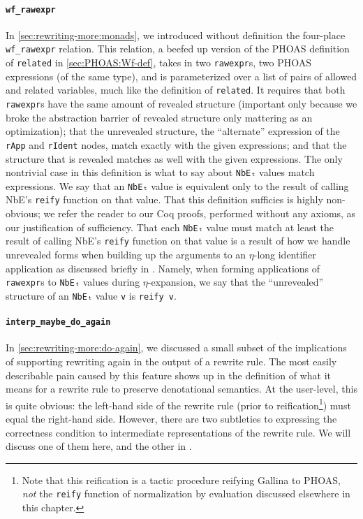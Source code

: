 \paragraph{\texorpdfstring{\texttt{wf_rawexpr}}{wf\_rawexpr}}
In \autoref{sec:rewriting-more:monads}, we introduced without definition the four-place \texttt{wf_rawexpr} relation.
This relation, a beefed up version of the PHOAS definition of \texttt{related} in \autoref{sec:PHOAS:Wf-def}, takes in two \texttt{rawexpr}s, two PHOAS expressions (of the same type), and is parameterized over a list of pairs of allowed and related variables, much like the definition of \texttt{related}.
It requires that both \texttt{rawexpr}s have the same amount of revealed structure (important only because we broke the abstraction barrier of revealed structure only mattering as an optimization); that the unrevealed structure, the ``alternate'' expression of the \texttt{rApp} and \texttt{rIdent} nodes, match exactly with the given expressions; and that the structure that is revealed matches as well with the given expressions.
The only nontrivial case in this definition is what to say about \texttt{NbEₜ} values match expressions.
We say that an \texttt{NbEₜ} value is equivalent only to the result of calling NbE's \texttt{reify} function on that value.
That this definition sufficies is highly non-obvious; we refer the reader to our Coq proofs, performed without any axioms, as our justification of sufficiency.
That each \texttt{NbEₜ} value must match at least the result of calling NbE's \texttt{reify} function on that value is a result of how we handle unrevealed forms when building up the arguments to an $\eta$-long identifier application as discussed briefly in .
Namely, when forming applications of \texttt{rawexpr}s to \texttt{NbEₜ} values during $\eta$-expansion, we say that the ``unrevealed'' structure of an \texttt{NbEₜ} value \texttt{v} is \texttt{reify v}.

\paragraph{\texorpdfstring{\texttt{interp_maybe_do_again}}{interp\_maybe\_do\_again}}
In \autoref{sec:rewriting-more:do-again}, we discussed a small subset of the implications of supporting rewriting again in the output of a rewrite rule.
The most easily describable pain caused by this feature shows up in the definition of what it means for a rewrite rule to preserve denotational semantics.
At the user-level, this is quite obvious: the left-hand side of the rewrite rule (prior to reification\footnote{%
  Note that this reification is a tactic procedure reifying Gallina to PHOAS, \emph{not} the \texttt{reify} function of normalization by evaluation discussed elsewhere in this chapter.%
}) must equal the right-hand side.
However, there are two subtleties to expressing the correctness condition to intermediate representations of the rewrite rule.
We will discuss one of them here, and the other in .

